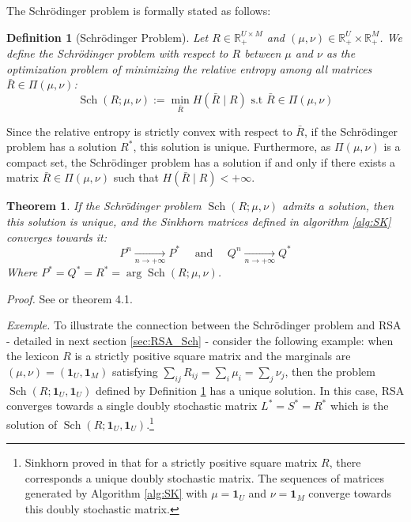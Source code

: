 \documentclass{article}
\newtheorem{theorem}{Theorem}[section] %
\newtheorem{definition}{Definition}[section] %
\begin{document}
The Schrödinger problem is formally stated as follows:

\begin{definition}[Schrödinger Problem] \label{def:schro}
Let $R\in\mathbb{R}^{U \times M}_{+}$ and $(\mu,\nu) \in \mathbb{R}^{U}_{+} \times \mathbb{R}^{M}_{+}$. We define the Schrödinger problem with respect to $R$ between $\mu$ and $\nu$ as the optimization problem of minimizing the relative entropy among all matrices $\bar R \in \Pi(\mu, \nu)$:
\begin{equation}
\operatorname{Sch}(R ; \mu, \nu):=\min_{\bar R}  H(\bar{R} \mid R) \text{ s.t } \bar{R} \in \Pi(\mu, \nu)
\end{equation}
\end{definition}



Since the relative entropy is strictly convex with respect to $\bar R$, if the Schrödinger problem has a solution $R^*$, this solution is unique. Furthermore, as $\Pi(\mu, \nu)$ is a compact set, the Schrödinger problem has a solution if and only if there exists a matrix $\bar R \in \Pi(\mu, \nu)$ such that $H(\bar R \mid R)<+\infty$.
\begin{theorem}
    If the Schrödinger problem $\operatorname{Sch}(R ; \mu, \nu)$ admits a solution, then this solution is unique, and the Sinkhorn matrices defined in algorithm \ref{alg:SK} converges towards it:
    \begin{equation}
        P^n \underset{n \rightarrow+\infty}{\longrightarrow} P^* \quad \text { and } \quad Q^n \underset{n \rightarrow+\infty}{\longrightarrow} Q^*
    \end{equation}
    Where $P^*=Q^*=R^*=\arg \operatorname{Sch}(R ; \mu, \nu)$.
\end{theorem}
\textit{Proof.} See \cite{pjm/1102992505} \cite{6770983} \cite{Sinkhorn1967DiagonalET} or \cite{idel2016reviewmatrixscalingsinkhorns} theorem 4.1.

\textit{Exemple.} To illustrate the connection between the Schrödinger problem and RSA - detailed in next section \ref{sec:RSA_Sch} - consider the following example: when the lexicon $R$ is a strictly positive square matrix and the marginals are $(\mu,\nu)=(\mathbf{1}_U,\mathbf{1}_M)$ satisfying $\sum_{ij} R_{ij}=\sum_i \mu_i=\sum_j \nu_j$, then the problem $\operatorname{Sch}(R ; \mathbf{1}_U, \mathbf{1}_U)$ defined by Definition \ref{def:schro} has a unique solution. In this case, RSA converges towards a single doubly stochastic matrix $L^*=S^*=R^*$ which is the solution of $\operatorname{Sch}(R ; \mathbf{1}_U, \mathbf{1}_U)$.\footnote{Sinkhorn proved in \cite{10.1214/aoms/1177703591} that for a strictly positive square matrix $R$, there corresponds a unique doubly stochastic matrix. The sequences of matrices generated by Algorithm \ref{alg:SK} with $\mu=\mathbf{1}_U$ and $\nu=\mathbf{1}_M$ converge towards this doubly stochastic matrix.} \\
\end{document}
